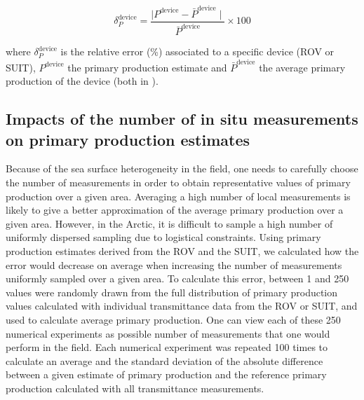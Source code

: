 \begin{linenomath*}
    \begin{equation}
		\delta_P^{\text{device}} = \frac{\mid P^{\text{device}} - \bar{P}^{\text{device}} \mid}{\bar{P}^{\text{device}}} \times 100
	\end{equation}
\end{linenomath*}

where $\delta_P^{\text{device}}$ is the relative error (\%) associated to a specific device (ROV or SUIT), $P^{\text{device}}$ the primary production estimate and $\bar{P}^{\text{device}}$ the average primary production of the device (both in \dailypp{}).

\subsection{Impacts of the number of in situ \DIFdelbegin {}\DIFdelend \DIFaddbegin {}\DIFaddend measurements on primary production estimates}

Because of the sea surface heterogeneity in the field, one needs to carefully choose the number of \DIFdelbegin {}\DIFdelend \DIFaddbegin {}\DIFaddend measurements in order to obtain representative values of primary production over a given area. Averaging a high number of local measurements is likely to give a better approximation of the average primary production over a given area. However, in the Arctic, it is difficult to sample a high number of uniformly dispersed sampling \DIFdelbegin {}\DIFdelend \DIFaddbegin {}\DIFaddend due to logistical constraints. Using primary production estimates derived from the ROV and the SUIT, we calculated how the error would decrease on average when increasing the number of measurements uniformly sampled over a given area. To calculate this error, between 1 and 250 values were randomly drawn from the full distribution of primary production values calculated with individual transmittance data from the ROV or SUIT, and used to calculate average primary production. One can view each of these 250 numerical experiments as possible number of \DIFdelbegin {}\DIFdelend \DIFaddbegin {}\DIFaddend measurements that one would perform in the field. Each numerical experiment was repeated 100 times to calculate an average and the standard deviation of the absolute difference between a given estimate of primary production and the reference primary production calculated with all transmittance measurements.


